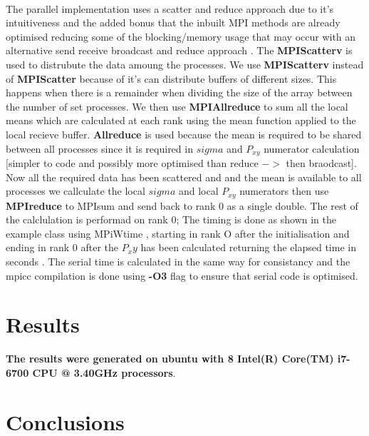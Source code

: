 \documentclass[12pt]{article}
\begin{document}
\paragraph*{}
The parallel implementation uses a scatter and reduce approach due to it's intuitiveness and the added bonus that the inbuilt MPI methods are already optimised reducing some of the blocking/memory usage that may occur with an alternative send receive broadcast and reduce approach .
The \textbf{MPI\textunderscore Scatterv} is used to distrubute the data amoung the processes. We use \textbf{MPI\textunderscore Scatterv} instead of \textbf{MPI\textunderscore Scatter} because of it's can distribute buffers of different sizes. This happens when there is a remainder when dividing the size of the array between the number of set processes. We then use 
\textbf{MPI\textunderscore Allreduce} to sum all the local means which are calculated at each rank using the mean function applied to the local recieve buffer. \textbf{Allreduce} is used because the mean is required to be shared between all processes since it is required in $sigma$ and $P_{xy}$ numerator calculation [simpler to code and possibly more optimised than reduce $ -> $ then braodcast]. Now all the required data has been scattered and and the mean is available to all processes we callculate the local $sigma$ and local $P_{xy}$ numerators then use \textbf{MPI\textunderscore reduce} to MPIsum and send back to rank 0 as a single double. The rest of the calclulation is performad on rank 0; The timing is done as shown in the example class using MPi\textunderscore Wtime , starting in rank O after the initialisation and ending in rank 0 after the $P_xy$ has been calculated returning the elapsed time in seconds . The serial time is calculated in the same way for consistancy and the mpicc compilation is done using  \textbf {-O3} flag to ensure that serial code is optimised.

\section{Results}

\textbf {The results were generated on ubuntu with 8  Intel(R) Core(TM) i7-6700 CPU @ 3.40GHz processors}.


\paragraph{}


\section{Conclusions}\label{conclusions}


%

%
\end{document}
